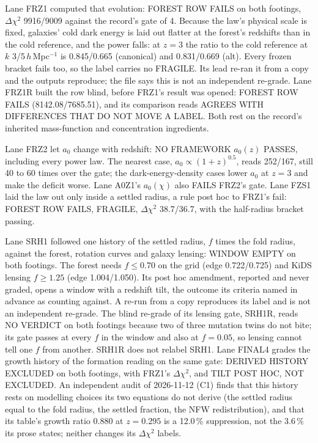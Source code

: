 \documentclass[10pt]{article}
\begin{document}
Lane FRZ1 computed that evolution: FOREST ROW FAILS on both footings, $\Delta\chi^2$ 9916/9009 against the record's gate of 4. Because the law's physical scale is fixed, galaxies' cold dark energy is laid out flatter at the forest's redshifts than in the cold reference, and the power falls: at $z=3$ the ratio to the cold reference at $k$ 3/5\,$h$\,Mpc$^{-1}$ is 0.845/0.665 (canonical) and 0.831/0.669 (alt). Every frozen bracket fails too, so the label carries no FRAGILE. Its lead re-ran it from a copy and the outputs reproduce; the file says this is not an independent re-grade. Lane FRZ1R built the row blind, before FRZ1's result was opened: FOREST ROW FAILS (8142.08/7685.51), and its comparison reads AGREES WITH DIFFERENCES THAT DO NOT MOVE A LABEL. Both rest on the record's inherited mass-function and concentration ingredients.

Lane FRZ2 let $a_0$ change with redshift: NO FRAMEWORK $a_0(z)$ PASSES, including every power law. The nearest case, $a_0\propto(1+z)^{0.5}$, reads 252/167, still 40 to 60 times over the gate; the dark-energy-density cases lower $a_0$ at $z=3$ and make the deficit worse. Lane A0Z1's $a_0(\chi)$ also FAILS FRZ2's gate. Lane FZS1 laid the law out only inside a settled radius, a rule post hoc to FRZ1's fail: FOREST ROW FAILS, FRAGILE, $\Delta\chi^2$ 38.7/36.7, with the half-radius bracket passing.

Lane SRH1 followed one history of the settled radius, $f$ times the fold radius, against the forest, rotation curves and galaxy lensing: WINDOW EMPTY on both footings. The forest needs $f\le0.70$ on the grid (edge 0.722/0.725) and KiDS lensing $f\ge1.25$ (edge 1.004/1.050). Its post hoc amendment, reported and never graded, opens a window with a redshift tilt, the outcome its criteria named in advance as counting against. A re-run from a copy reproduces its label and is not an independent re-grade. The blind re-grade of its lensing gate, SRH1R, reads NO VERDICT on both footings because two of three mutation twins do not bite; its gate passes at every $f$ in the window and also at $f=0.05$, so lensing cannot tell one $f$ from another. SRH1R does not relabel SRH1. Lane FINAL4 grades the growth history of the formation reading on the same gate: DERIVED HISTORY EXCLUDED on both footings, with FRZ1's $\Delta\chi^2$, and TILT POST HOC, NOT EXCLUDED. An independent audit of 2026-11-12 (C1) finds that this history rests on modelling choices its two equations do not derive (the settled radius equal to the fold radius, the settled fraction, the NFW redistribution), and that its table's growth ratio 0.880 at $z=0.295$ is a 12.0\,\% suppression, not the 3.6\,\% its prose states; neither changes its $\Delta\chi^2$ labels.
\end{document}
